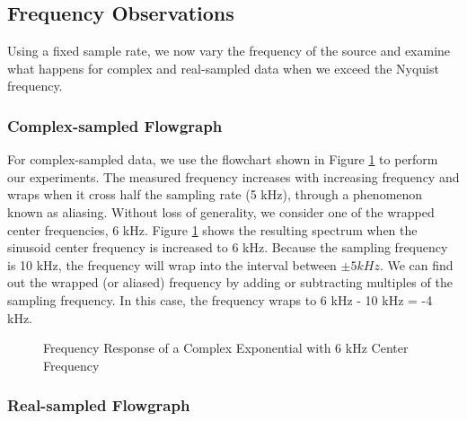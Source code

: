 \documentclass{article}
\begin{document}
\subsection{Frequency Observations}

Using a fixed sample rate, we now vary the frequency of the source and examine what happens for complex and real-sampled data when we exceed the Nyquist frequency.

\subsubsection{Complex-sampled Flowgraph}

For complex-sampled data, we use the flowchart shown in Figure \ref{fig::freq_observations_complex_6k_center_freq} to perform our experiments. The measured frequency increases with increasing frequency and wraps when it cross half the sampling rate (5 kHz), through a phenomenon known as aliasing. Without loss of generality, we consider one of the wrapped center frequencies, 6 kHz. Figure \ref{fig::freq_observations_complex_6k_center_freq} shows the resulting spectrum when the sinusoid center frequency is increased to 6 kHz. Because the sampling frequency is 10 kHz, the frequency will wrap into the interval between $\pm 5 kHz$. We can find out the wrapped (or aliased) frequency by adding or subtracting multiples of the sampling frequency. In this case, the frequency wraps to 6 kHz - 10 kHz = -4 kHz.

\begin{figure}[H]
	\centerline{}
	\caption{Frequency Response of a Complex Exponential with 6 kHz Center Frequency}
	\label{fig::freq_observations_complex_6k_center_freq}
\end{figure}

\subsubsection{Real-sampled Flowgraph}
\end{document}
